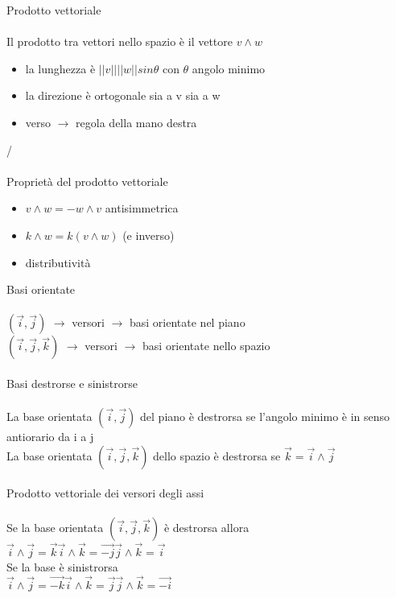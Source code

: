 \documentclass{article}
\begin{document}
{\large Prodotto vettoriale}\\\\
Il prodotto tra vettori nello spazio è il vettore \(v\wedge w\)\\
\begin{itemize}
    \item la lunghezza è \(\lvert\lvert v \rvert\rvert\lvert\lvert w \rvert\rvert sin\theta\) con \(\theta\) angolo minimo
    \item la direzione è ortogonale sia a v sia a w
    \item verso \(\rightarrow{}\) regola della mano destra
\end{itemize}
/\\\\
Proprietà del prodotto vettoriale\\
\begin{itemize}
    \item \(v\wedge w = -w\wedge v\) antisimmetrica
    \item \(k \wedge w =k(v\wedge w)\) (e inverso)
    \item distributività
\end{itemize}
Basi orientate\\\\
\((\vec{i},\vec{j})\) \(\rightarrow{}\) versori \(\rightarrow{}\) basi orientate nel piano\\
\((\vec{i},\vec{j},\vec{k})\) \(\rightarrow{}\) versori \(\rightarrow{}\) basi orientate nello spazio\\\\
Basi destrorse e sinistrorse\\\\
La base orientata \((\vec{i},\vec{j})\) del piano è destrorsa se l'angolo minimo è in senso antiorario da i a j\\
La base orientata \((\vec{i},\vec{j},\vec{k})\) dello spazio è destrorsa se \(\vec{k}=\vec{i}\wedge\vec{j}\)\\\\
Prodotto vettoriale dei versori degli assi\\\\
Se la base orientata \((\vec{i},\vec{j},\vec{k})\) è destrorsa allora\\
\(\vec{i}\wedge\vec{j}=\vec{k}\)\(\vec{i}\wedge\vec{k}=\vec{-j}\)\(\vec{j}\wedge\vec{k}=\vec{i}\)\\
Se la base è sinistrorsa\\
\(\vec{i}\wedge\vec{j}=\vec{-k}\)\(\vec{i}\wedge\vec{k}=\vec{j}\)\(\vec{j}\wedge\vec{k}=\vec{-i}\)\\\\\\
\end{document}
